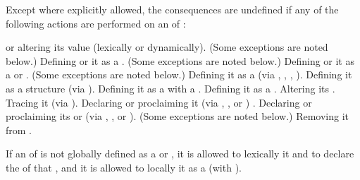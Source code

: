 Except where explicitly allowed, the consequences are undefined if any
of the following actions are performed on an  
of :

\beginlist
{} 
 or altering its value (lexically or dynamically).
(Some exceptions are noted below.)
Defining or  it as a .
(Some exceptions are noted below.)
Defining or  it as a 
or .
(Some exceptions are noted below.)
Defining it as a  (via , 
, , ).
Defining it as a structure (via ).
Defining it as a  with a  .
Defining it as a .
Altering its .
Tracing it  (via ).
Declaring or proclaiming it
(via ,
   ,
or ) 
.
Declaring or proclaiming its 
 or  (via ,
,  or ).
(Some exceptions are noted below.)
Removing it from .
\endlist 


If an  of 
is not globally defined as a   
					      or ,
it is allowed to lexically  it 
          and to declare the  of that , 
and
it is allowed to locally  it as a  
(\eg with ).

